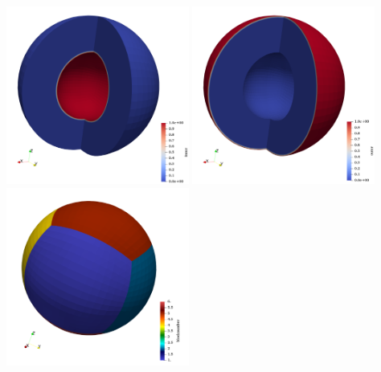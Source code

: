 \documentclass[a4paper]{article}
\begin{document}
\includegraphics[width=6cm]{images/tas/inner}
\includegraphics[width=6cm]{images/tas/outer}
\includegraphics[width=6cm]{images/tas/blocknb}
\end{document}
